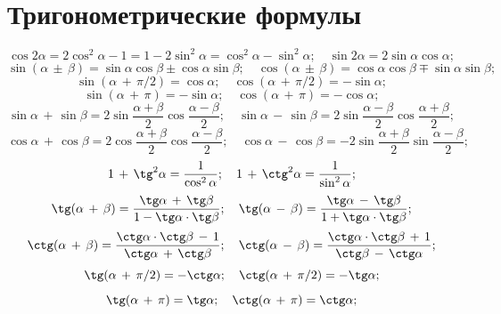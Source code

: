 \section{Тригонометрические формулы}
\[ \cos2\alpha=2\cos^2{\alpha}-1=1-2\sin^2{\alpha}=\cos^2{\alpha}-\sin^2{\alpha}; \quad \sin{2\alpha}=2\sin\alpha\cos\alpha;\] \vspace{0.1mm}
\[ \sin(\alpha\,\pm\,\beta)=\sin\alpha\cos\beta \pm \cos\alpha\sin\beta; \quad \cos(\alpha\,\pm\,\beta)=\cos\alpha\cos\beta \mp \sin\alpha\sin\beta; \] \vspace{0.1mm}
\[ \sin(\alpha\,+\,\pi/2)=\cos\alpha; \quad \cos(\alpha\,+\,\pi/2)=-\sin\alpha; \] \vspace{0.1mm}
\[ \sin(\alpha\,+\,\pi)=-\sin\alpha; \quad \cos(\alpha\,+\,\pi)=-\cos\alpha; \] \vspace{0.1mm}
\[ \sin\alpha\,+\,\sin\beta= 2\sin{\dfrac{\alpha+\beta}{2}}\cos{\dfrac{\alpha-\beta}{2}}; \quad \sin\alpha\,-\,\sin\beta= 2\sin{\dfrac{\alpha-\beta}{2}}\cos{\dfrac{\alpha+\beta}{2}};\] \vspace{0.1mm}
\[ \cos\alpha\,+\,\cos\beta= 2\cos{\dfrac{\alpha+\beta}{2}}\cos{\dfrac{\alpha-\beta}{2}}; \quad \cos\alpha\,-\,\cos\beta= -2\sin{\dfrac{\alpha+\beta}{2}}\sin{\dfrac{\alpha-\beta}{2}};\] \vspace{0.1mm}
\[ 1\,+\,\tg ^2\alpha=\dfrac{1}{\cos^2\alpha}; \quad 1\,+\,\ctg ^2\alpha=\dfrac{1}{\sin^2\alpha}; \] \vspace{0.1mm}
\[ \tg (\alpha\,+\,\beta)=\dfrac{\tg \alpha\,+\, \tg \beta}{1-\tg \alpha \cdot \tg \beta}; \quad \tg (\alpha\,-\,\beta)=\dfrac{\tg \alpha\,-\, \tg \beta}{1+\tg \alpha \cdot \tg \beta}; \] \vspace{0.1mm}
\[ \ctg (\alpha\,+\,\beta)=\dfrac{\ctg \alpha\cdot \ctg \beta\,-\,1}{\ctg \alpha\,+\,\ctg \beta}; \quad \ctg (\alpha\,-\,\beta)=\dfrac{\ctg \alpha\cdot \ctg \beta\,+\,1}{\ctg \beta\,-\,\ctg \alpha}; \] \vspace{0.1mm}
\[ \tg (\alpha\,+\,\pi/2)=-\ctg \alpha; \quad \ctg(\alpha\,+\,\pi/2)=-\tg \alpha; \] \vspace{0.1mm}
\[ \tg (\alpha\,+\,\pi)=\tg \alpha; \quad \ctg(\alpha\,+\,\pi)=\ctg \alpha; \] \vspace{0.1mm}
\vspace{0.1mm}


